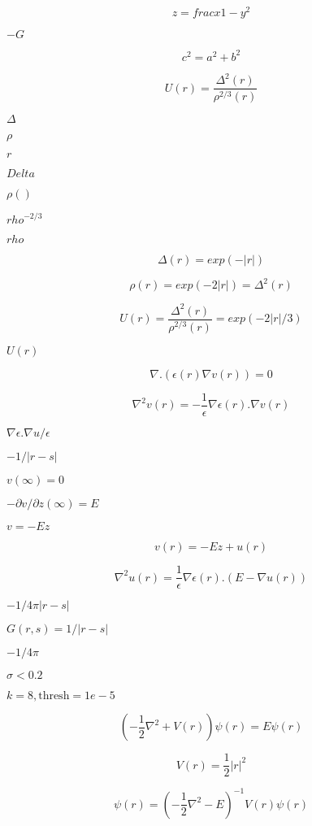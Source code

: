\documentclass{article}
\begin{document}
\[
z = frac{x}{1 - y^2}
\]
\pagebreak

$-G$
\pagebreak

\[
c^2 = a^2 + b^2
\]
\pagebreak

\[
U(r) = \frac{\Delta^2 (r)}{\rho^{2/3} (r)}
\]
\pagebreak

$ \Delta $
\pagebreak

$ \rho $
\pagebreak

$ r $
\pagebreak

$ Delta $
\pagebreak

$ \rho() $
\pagebreak

$ rho^{-2/3} $
\pagebreak

$ rho $
\pagebreak

\[
\Delta(r) = exp(- | r | )
\]
\pagebreak

\[
\rho(r) = exp(- 2 | r | ) = \Delta^2(r)
\]
\pagebreak

\[
U(r) = \frac{\Delta^2 (r)}{\rho^{2/3} (r)} = exp( - 2 | r | / 3)
\]
\pagebreak

$
U(r) $
\pagebreak

\[
\nabla . \left( \epsilon(r) \nabla v(r)  \right) = 0
\]
\pagebreak

\[
   \nabla^2 v(r) = - \frac{1}{\epsilon} \nabla \epsilon(r) .  \nabla v(r)
\]
\pagebreak

$\nabla \epsilon . \nabla u / \epsilon$
\pagebreak

$-1 / |r-s|$
\pagebreak

$v(\infty)=0$
\pagebreak

$- \partial v / \partial z(\infty) = E$
\pagebreak

$v = - E z$
\pagebreak

\[
v(r) = - E z + u(r)
\]
\pagebreak

\[
   \nabla^2 u(r) = \frac{1}{\epsilon} \nabla \epsilon(r) .  \left(E - \nabla u(r) \right)
\]
\pagebreak

$-1 / 4 \pi |r-s|$
\pagebreak

$G(r,s) = 1/|r-s|$
\pagebreak

$-1/4\pi$
\pagebreak

$\sigma<0.2$
\pagebreak

$k=8, \mbox{thresh}=1e-5$
\pagebreak

\[
\left( -\frac{1}{2} \nabla^2 + V(r) \right) \psi(r) = E \psi(r)
\]
\pagebreak

\[
V(r) = \frac{1}{2} |r|^2
\]
\pagebreak

\[
\psi(r) = \left( -\frac{1}{2} \nabla^2 - E \right)^{-1} V(r) \psi(r)
\]
\pagebreak
\end{document}
